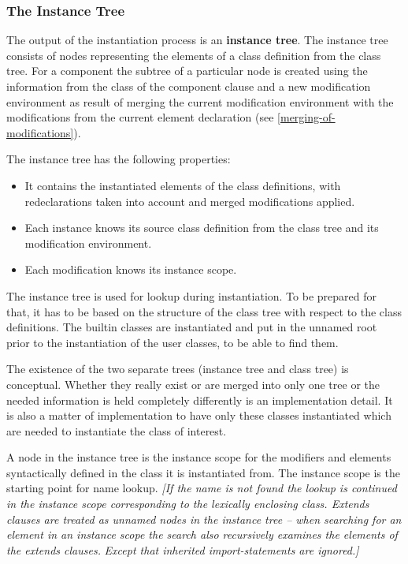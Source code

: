 \subsubsection{The Instance Tree}

The output of the instantiation process is an \textbf{instance tree}.
The instance tree consists of nodes representing the elements of a class
definition from the class tree. For a component the subtree of a
particular node is created using the information from the class of the
component clause and a new modification environment as result of merging
the current modification environment with the modifications from the
current element declaration (see \autoref{merging-of-modifications}).

The instance tree has the following properties:
\begin{itemize}
\item
  It contains the instantiated elements of the class definitions, with
  redeclarations taken into account and merged modifications applied.
\end{itemize}

\begin{itemize}
\item
  Each instance knows its source class definition from the class tree
  and its modification environment.
\item
  Each modification knows its instance scope.
\end{itemize}

The instance tree is used for lookup during instantiation. To be
prepared for that, it has to be based on the structure of the class tree
with respect to the class definitions. The builtin classes are
instantiated and put in the unnamed root prior to the instantiation of
the user classes, to be able to find them.

\begin{nonnormative}
The existence of the two separate trees (instance tree and
class tree) is conceptual. Whether they really exist or are merged into
only one tree or the needed information is held completely differently
is an implementation detail. It is also a matter of implementation to
have only these classes instantiated which are needed to instantiate the
class of interest.
\end{nonnormative}

A node in the instance tree is the instance scope for the modifiers and
elements syntactically defined in the class it is instantiated from. The
instance scope is the starting point for name lookup. \emph{{[}If the
name is not found the lookup is continued in the instance scope
corresponding to the lexically enclosing class. Extends clauses are
treated as unnamed nodes in the instance tree -- when searching for an
element in an instance scope the search also recursively examines the
elements of the extends clauses.} \emph{Except that inherited
import-statements are ignored.{]}}

